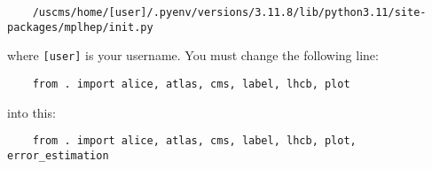 \begin{verbatim}
    /uscms/home/[user]/.pyenv/versions/3.11.8/lib/python3.11/site-packages/mplhep/init.py
\end{verbatim}

\noindent where \verb|[user]| is your username. You must change the following line:

\begin{verbatim}
    from . import alice, atlas, cms, label, lhcb, plot
\end{verbatim}

\noindent into this:

\begin{verbatim}
    from . import alice, atlas, cms, label, lhcb, plot, error_estimation
\end{verbatim}